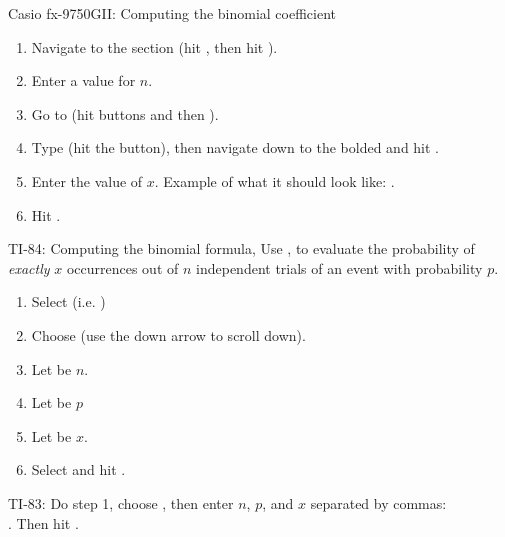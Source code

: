 \begin{onebox}{ Casio fx-9750GII: Computing the binomial coefficient \MakeLowercase{}}
\begin{enumerate}
\setlength{\itemsep}{0mm}
\item Navigate to the  section (hit , then hit ).
\item Enter a value for $n$.
\item Go to  (hit buttons  and then ).
\item Type  (hit the  button), then navigate down to the bolded  and hit .
\item Enter the value of $x$. Example of what it should look like: .
\item Hit .
\end{enumerate}
\end{onebox}

\begin{onebox}{ TI-84: Computing the binomial formula, }
\label{binomialformula}
Use  ,  to evaluate the probability of \emph{exactly} $x$ occurrences out of $n$ independent trials of an event with probability $p$. 
\begin{enumerate}
\setlength{\itemsep}{0mm}
\item Select   (i.e. )
\item Choose  (use the down arrow to scroll down).
\item Let  be $n$.
\item Let  be $p$
\item Let  be $x$.
\item Select  and hit .\vspace{-1.5mm}
\end{enumerate}
TI-83: Do step 1, choose , then enter $n$, $p$, and $x$ separated by commas:\\
	. Then hit . 
\end{onebox}

